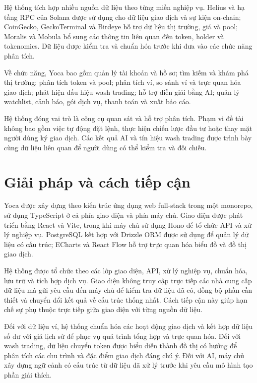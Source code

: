 Hệ thống tích hợp nhiều nguồn dữ liệu theo từng miền nghiệp vụ. Helius và hạ tầng RPC của Solana được sử dụng cho dữ liệu giao dịch và sự kiện on-chain; CoinGecko, GeckoTerminal và Birdeye hỗ trợ dữ liệu thị trường, giá và pool; Moralis và Mobula bổ sung các thông tin liên quan đến token, holder và tokenomics. Dữ liệu được kiểm tra và chuẩn hóa trước khi đưa vào các chức năng phân tích.

Về chức năng, Yoca bao gồm quản lý tài khoản và hồ sơ; tìm kiếm và khám phá thị trường; phân tích token và pool; phân tích ví, so sánh ví và trực quan hóa giao dịch; phát hiện dấu hiệu wash trading; hỗ trợ diễn giải bằng AI; quản lý watchlist, cảnh báo, gói dịch vụ, thanh toán và xuất báo cáo.

Hệ thống đóng vai trò là công cụ quan sát và hỗ trợ phân tích. Phạm vi đề tài không bao gồm việc tự động đặt lệnh, thực hiện chiến lược đầu tư hoặc thay mặt người dùng ký giao dịch. Các kết quả AI và tín hiệu wash trading được trình bày cùng dữ liệu liên quan để người dùng có thể kiểm tra và đối chiếu.

\section{Giải pháp và cách tiếp cận}
\label{sec:giai_phap}

Yoca được xây dựng theo kiến trúc ứng dụng web full-stack trong một monorepo, sử dụng TypeScript ở cả phía giao diện và phía máy chủ. Giao diện được phát triển bằng React và Vite, trong khi máy chủ sử dụng Hono để tổ chức API và xử lý nghiệp vụ. PostgreSQL kết hợp với Drizzle ORM được sử dụng để quản lý dữ liệu có cấu trúc; ECharts và React Flow hỗ trợ trực quan hóa biểu đồ và đồ thị giao dịch.

Hệ thống được tổ chức theo các lớp giao diện, API, xử lý nghiệp vụ, chuẩn hóa, lưu trữ và tích hợp dịch vụ. Giao diện không truy cập trực tiếp các nhà cung cấp dữ liệu mà gửi yêu cầu đến máy chủ để kiểm tra dữ liệu đã có, đồng bộ phần cần thiết và chuyển đổi kết quả về cấu trúc thống nhất. Cách tiếp cận này giúp hạn chế sự phụ thuộc trực tiếp giữa giao diện với từng nguồn dữ liệu.

Đối với dữ liệu ví, hệ thống chuẩn hóa các hoạt động giao dịch và kết hợp dữ liệu số dư với giá lịch sử để phục vụ quá trình tổng hợp và trực quan hóa. Đối với wash trading, dữ liệu chuyển token được biểu diễn thành đồ thị có hướng để phân tích các chu trình và đặc điểm giao dịch đáng chú ý. Đối với AI, máy chủ xây dựng ngữ cảnh có cấu trúc từ dữ liệu đã xử lý trước khi yêu cầu mô hình tạo phần giải thích.

